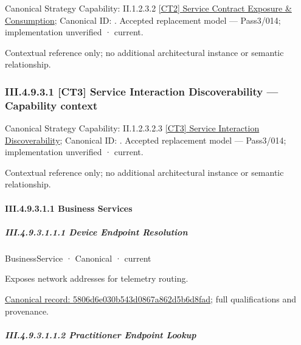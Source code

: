 {\small Canonical Strategy Capability: II.1.2.3.2 \hyperref[element:bee33783461e4d1bb0cd354c1fb8560e]{[CT2] Service Contract Exposure \& Consumption}; Canonical ID: \texttt{}. Accepted replacement model — Pass3/014; implementation unverified · current.}\par
Contextual reference only; no additional architectural instance or semantic relationship.\par
\subsubsection*{III.4.9.3.1 [CT3] Service Interaction Discoverability — Capability context}
\label{navigation:III.4.9.3.1}

{\small Canonical Strategy Capability: II.1.2.3.2.3 \hyperref[element:84a28d9f09684d3ba6446d0f7d6cdf7f]{[CT3] Service Interaction Discoverability}; Canonical ID: \texttt{}. Accepted replacement model — Pass3/014; implementation unverified · current.}\par
Contextual reference only; no additional architectural instance or semantic relationship.\par
\paragraph*{III.4.9.3.1.1 Business Services}
\label{navigation:III.4.9.3.1.1}

\subparagraph*{III.4.9.3.1.1.1 Device Endpoint Resolution}
\label{navigation:III.4.9.3.1.1.1}

\label{element:5806d6e030b543d0867a862d5b6d8fad}
{\small BusinessService · Canonical · current}\par

Exposes network addresses for telemetry routing.


{\footnotesize \href{../../../../continuum/business/business-service/5806d6e030b543d0867a862d5b6d8fad.md}{Canonical record: 5806d6e030b543d0867a862d5b6d8fad}; full qualifications and provenance.}\par
\subparagraph*{III.4.9.3.1.1.2 Practitioner Endpoint Lookup}
\label{navigation:III.4.9.3.1.1.2}

